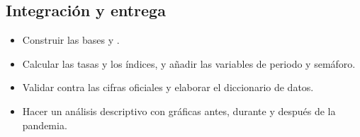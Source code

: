 \subsection{Integración y entrega}
\begin{itemize}[label={}]
  \item \falta{} Construir las bases  y .
  \item \falta{} Calcular las tasas y los índices, y añadir las variables de periodo y semáforo.
  \item \falta{} Validar contra las cifras oficiales y elaborar el diccionario de datos.
  \item \falta{} Hacer un análisis descriptivo con gráficas antes, durante y después de la pandemia.
\end{itemize}
